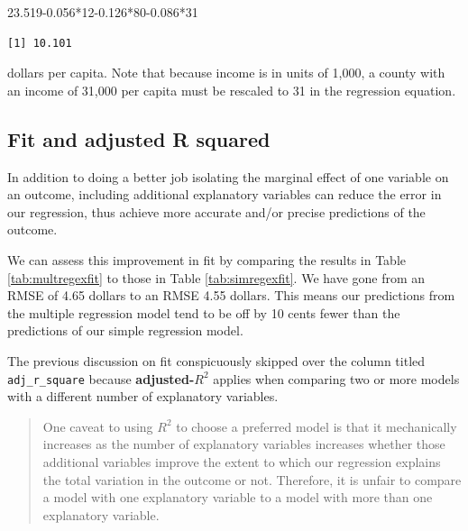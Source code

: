 \documentclass[
]{book}
\makeatletter
\newenvironment{Shaded}{\begin{snugshade}}{\end{snugshade}}
\newcommand{\DecValTok}[1]{\textcolor[rgb]{0.06,0.06,0.06}{#1}}
\newcommand{\FloatTok}[1]{\textcolor[rgb]{0.06,0.06,0.06}{#1}}
\newcommand{\SpecialCharTok}[1]{\textcolor[rgb]{0,0,0}{#1}}
\newenvironment{kframe}{%
\medskip{}
\setlength{\fboxsep}{.8em}
 \def\at@end@of@kframe{}%
 \ifinner\ifhmode%
  \def\at@end@of@kframe{\end{minipage}}%
  \begin{minipage}{\columnwidth}%
 \fi\fi%
 \def\FrameCommand##1{\hskip\@totalleftmargin \hskip-\fboxsep
 \colorbox{shadecolor}{##1}\hskip-\fboxsep
     \hskip-\linewidth \hskip-\@totalleftmargin \hskip\columnwidth}%
 \MakeFramed {\advance\hsize-\width
   \@totalleftmargin\z@ \linewidth\hsize
   \@setminipage}}%
 {\par\unskip\endMakeFramed%
 \at@end@of@kframe}
\renewenvironment{Shaded}{\begin{kframe}}{\end{kframe}}
\makeatother
\begin{document}
\begin{Shaded}
\begin{Highlighting}[]
\FloatTok{23.519{-}0.056}\SpecialCharTok{*}\DecValTok{12}\FloatTok{{-}0.126}\SpecialCharTok{*}\DecValTok{80}\FloatTok{{-}0.086}\SpecialCharTok{*}\DecValTok{31}
\end{Highlighting}
\end{Shaded}

\begin{verbatim}
[1] 10.101
\end{verbatim}

dollars per capita. Note that because income is in units of 1,000, a county with an income of 31,000 per capita must be rescaled to 31 in the regression equation.

\hypertarget{fit-and-adjusted-r-squared}{%
\subsection{Fit and adjusted R squared}\label{fit-and-adjusted-r-squared}}

In addition to doing a better job isolating the marginal effect of one variable on an outcome, including additional explanatory variables can reduce the error in our regression, thus achieve more accurate and/or precise predictions of the outcome.

We can assess this improvement in fit by comparing the results in Table \ref{tab:multregexfit} to those in Table \ref{tab:simregexfit}. We have gone from an RMSE of 4.65 dollars to an RMSE 4.55 dollars. This means our predictions from the multiple regression model tend to be off by 10 cents fewer than the predictions of our simple regression model.

The previous discussion on fit conspicuously skipped over the column titled \texttt{adj\_r\_square} because \textbf{adjusted-\(R^2\)} applies when comparing two or more models with a different number of explanatory variables.

\begin{quote}
One caveat to using \(R^2\) to choose a preferred model is that it mechanically increases as the number of explanatory variables increases whether those additional variables improve the extent to which our regression explains the total variation in the outcome or not. Therefore, it is unfair to compare a model with one explanatory variable to a model with more than one explanatory variable.
\end{quote}
\end{document}
